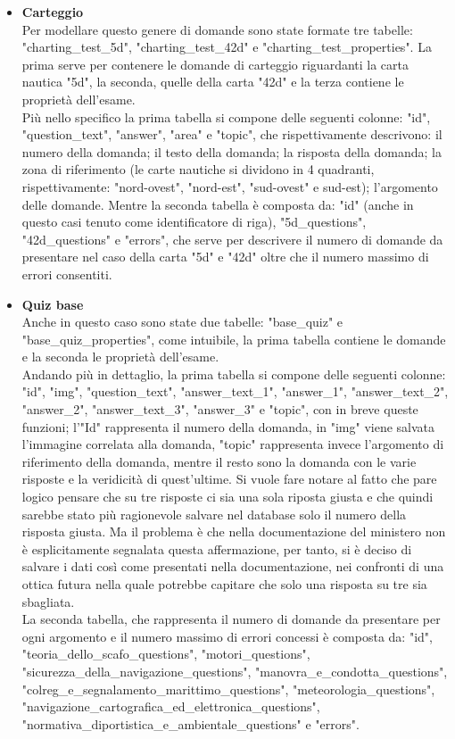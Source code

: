 \begin{itemize}
	\item \textbf{Carteggio}\\
	Per modellare questo genere di domande sono state formate tre tabelle: "charting_test_5d", "charting_test_42d" e "charting_test_properties". La prima serve per contenere  le domande di carteggio riguardanti la carta nautica "5d", la seconda, quelle della carta "42d" e la terza contiene le proprietà dell'esame.\\
	Più nello specifico la prima tabella si compone delle seguenti colonne: "id", "question_text", "answer", "area" e "topic", che rispettivamente descrivono: il numero della domanda; il testo della domanda; la risposta della domanda; la zona di riferimento (le carte nautiche si dividono in 4 quadranti, rispettivamente: "nord-ovest", "nord-est", "sud-ovest" e sud-est); l'argomento delle domande.  Mentre la seconda tabella è composta da: "id" (anche in questo casi tenuto come identificatore di riga), "5d_questions", "42d_questions" e "errors", che serve per descrivere il numero di domande da presentare nel caso della carta "5d" e  "42d" oltre che il numero massimo di errori consentiti. \\
	
	\item \textbf{Quiz base}\\
	Anche in questo caso sono state due tabelle: "base_quiz" e "base_quiz_properties", come intuibile, la prima tabella contiene le domande e la seconda le proprietà dell'esame.\\
	Andando più in dettaglio, la prima tabella si compone delle seguenti colonne: "id", "img",  "question_text", "answer_text_1", "answer_1", "answer_text_2", "answer_2", "answer_text_3", "answer_3" e "topic", con in breve queste funzioni; l'"Id" rappresenta il numero della domanda, in "img" viene salvata l'immagine correlata alla domanda, "topic" rappresenta invece l'argomento di riferimento della domanda, mentre il resto sono la domanda con le varie risposte e la veridicità di quest'ultime. Si vuole fare notare al fatto che pare logico pensare che su tre risposte ci sia una sola riposta giusta e che quindi sarebbe stato più ragionevole salvare nel database solo il numero della risposta giusta. Ma il problema è che nella documentazione del ministero non è esplicitamente segnalata questa affermazione, per tanto, si è deciso di salvare i dati così come presentati nella documentazione,  nei confronti di una ottica futura nella quale potrebbe capitare che solo una risposta su tre sia sbagliata.\\
	La seconda tabella, che rappresenta il numero di domande da presentare per ogni argomento e il numero massimo di errori concessi è composta da: "id", "teoria_dello_scafo_questions", "motori_questions", "sicurezza_della_navigazione_questions", "manovra_e_condotta_questions", "colreg_e_segnalamento_marittimo_questions", "meteorologia_questions", "navigazione_cartografica_ed_elettronica_questions", "normativa_diportistica_e_ambientale_questions" e  "errors".\\
	

\end{itemize}
